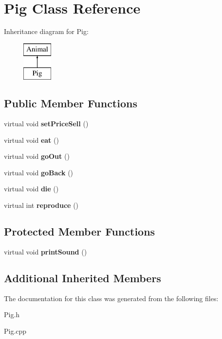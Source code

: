 \hypertarget{class_pig}{}\section{Pig Class Reference}
\label{class_pig}
Inheritance diagram for Pig\+:\begin{figure}[H]
\begin{center}
\leavevmode
\includegraphics[height=2.000000cm]{class_pig}
\end{center}
\end{figure}
\subsection*{Public Member Functions}
\begin{DoxyCompactItemize}
\item 
\mbox{\label{class_pig_a0211e2fe87af7df616125ea0c3c49b9b}} 
virtual void {\bfseries set\+Price\+Sell} ()
\item 
\mbox{\label{class_pig_a101d2ba5c0384f287a4d762c0b103929}} 
virtual void {\bfseries eat} ()
\item 
\mbox{\label{class_pig_a346e5a198e9a2208afda64f271e18ce4}} 
virtual void {\bfseries go\+Out} ()
\item 
\mbox{\label{class_pig_a60379946df38136bbd1c984cb2b81c1b}} 
virtual void {\bfseries go\+Back} ()
\item 
\mbox{\label{class_pig_ac6f4adb5d005de651af8b2769f693638}} 
virtual void {\bfseries die} ()
\item 
\mbox{\label{class_pig_a50a4bb2ccc915d430270b032a463de66}} 
virtual int {\bfseries reproduce} ()
\end{DoxyCompactItemize}
\subsection*{Protected Member Functions}
\begin{DoxyCompactItemize}
\item 
\mbox{\label{class_pig_ab16375db4a149025ea7b2332db7dc519}} 
virtual void {\bfseries print\+Sound} ()
\end{DoxyCompactItemize}
\subsection*{Additional Inherited Members}


The documentation for this class was generated from the following files\+:\begin{DoxyCompactItemize}
\item 
Pig.\+h\item 
Pig.\+cpp\end{DoxyCompactItemize}
